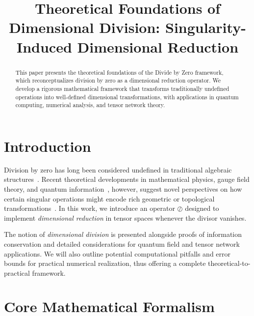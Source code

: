 \documentclass[sn-mathphys-num]{sn-jnl}
\theoremstyle{thmstyleone}
\theoremstyle{thmstyletwo}
\theoremstyle{thmstylethree}
\begin{document}
\title[Theoretical Foundations of Dimensional Division]{\textbf{Theoretical Foundations of Dimensional Division: Singularity-Induced Dimensional Reduction}}

\author*[1]{ }

\begin{abstract}
\hspace{}This paper presents the theoretical foundations of the Divide by Zero framework, 
which reconceptualizes division by zero as a dimensional reduction operator. 
We develop a rigorous mathematical framework that transforms traditionally 
undefined operations into well-defined dimensional transformations, with applications 
in quantum computing, numerical analysis, and tensor network theory.
\end{abstract}


\maketitle

\section{Introduction}
Division by zero has long been considered undefined in traditional algebraic structures~\cite{knuth1992two}. 
Recent theoretical developments in mathematical physics, gauge field theory, and quantum 
information~\cite{witten2018mini}, however, suggest novel perspectives on how certain singular operations might 
encode rich geometric or topological transformations~\cite{penrose1971applications}. 
In this work, we introduce an operator $\oslash$ designed to implement 
\emph{dimensional reduction} in tensor spaces whenever the divisor vanishes.

The notion of \emph{dimensional division} is presented alongside proofs of 
information conservation and detailed considerations for quantum field and tensor network 
applications. We will also outline potential computational pitfalls and error bounds for 
practical numerical realization, thus offering a complete theoretical-to-practical framework.

\section{Core Mathematical Formalism}
\end{document}
